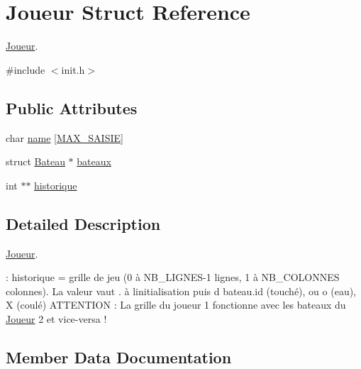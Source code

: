 \hypertarget{structJoueur}{}\section{Joueur Struct Reference}
\label{structJoueur}


\hyperlink{structJoueur}{Joueur}.  




{\ttfamily \#include $<$init.\+h$>$}

\subsection*{Public Attributes}
\begin{DoxyCompactItemize}
\item 
char \hyperlink{structJoueur_ab612f3b383ec2463e302d1f8ba5fc4fd}{name} \mbox{[}\hyperlink{init_8h_a2277af00d169389a0db61a0dbefa2e05}{M\+A\+X\+\_\+\+S\+A\+I\+S\+IE}\mbox{]}
\item 
struct \hyperlink{structBateau}{Bateau} $\ast$ \hyperlink{structJoueur_a950c3ca390a307cfd21d7095b4d5554e}{bateaux}
\item 
int $\ast$$\ast$ \hyperlink{structJoueur_a592804f8ad7d125fabdf06bbbffd60c2}{historique}
\end{DoxyCompactItemize}


\subsection{Detailed Description}
\hyperlink{structJoueur}{Joueur}. 

\+: historique = grille de jeu (0 à N\+B\+\_\+\+L\+I\+G\+N\+E\+S-\/1 lignes, 1 à N\+B\+\_\+\+C\+O\+L\+O\+N\+N\+ES colonnes). La valeur vaut \textquotesingle{}.\textquotesingle{} à l\textquotesingle{}initialisation puis \textquotesingle{}d\textquotesingle{} bateau.\+id (touché), ou \textquotesingle{}o\textquotesingle{} (eau), \textquotesingle{}X\textquotesingle{} (coulé) A\+T\+T\+E\+N\+T\+I\+ON \+: La grille du joueur 1 fonctionne avec les bateaux du \hyperlink{structJoueur}{Joueur} 2 et vice-\/versa ! 

\subsection{Member Data Documentation}
\hypertarget{structJoueur_a950c3ca390a307cfd21d7095b4d5554e}{}\label{structJoueur_a950c3ca390a307cfd21d7095b4d5554e} 
